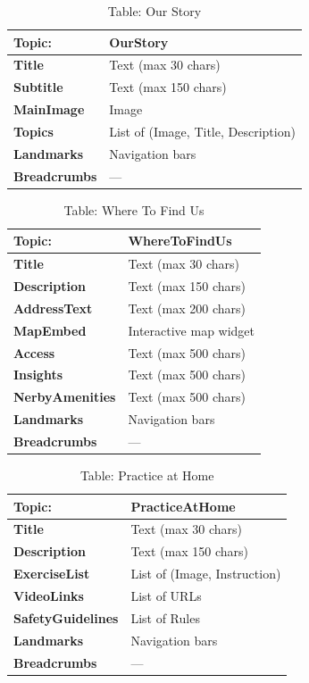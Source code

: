 \begin{table}[H]
\centering
\begin{tabularx}{\textwidth}{|>{\bfseries}l|X|}
\hline
Topic: & \textbf{OurStory} \\
\hline
Title & Text (max 30 chars) \\
\hline
Subtitle & Text (max 150 chars) \\
\hline
MainImage & Image \\
\hline
Topics & List of (Image, Title, Description) \\
\hline
Landmarks & Navigation bars \\
\hline
Breadcrumbs & — \\
\hline
\end{tabularx}
\caption{Table: Our Story}
\end{table}

\begin{table}[H]
\centering
\begin{tabularx}{\textwidth}{|>{\bfseries}l|X|}
\hline
Topic: & \textbf{WhereToFindUs} \\
\hline
Title & Text (max 30 chars) \\
\hline
Description & Text (max 150 chars) \\
\hline
AddressText & Text (max 200 chars) \\
\hline
MapEmbed & Interactive map widget \\
\hline
Access & Text (max 500 chars) \\
\hline
Insights & Text (max 500 chars) \\
\hline
NerbyAmenities & Text (max 500 chars) \\
\hline
Landmarks & Navigation bars \\
\hline
Breadcrumbs & — \\
\hline
\end{tabularx}
\caption{Table: Where To Find Us}
\end{table}

\begin{table}[H]
\centering
\begin{tabularx}{\textwidth}{|>{\bfseries}l|X|}
\hline
Topic: & \textbf{PracticeAtHome} \\
\hline
Title & Text (max 30 chars) \\
\hline
Description & Text (max 150 chars) \\
\hline
ExerciseList & List of (Image, Instruction) \\
\hline
VideoLinks & List of URLs \\
\hline
SafetyGuidelines & List of Rules \\
\hline
Landmarks & Navigation bars \\
\hline
Breadcrumbs & — \\
\hline
\end{tabularx}
\caption{Table: Practice at Home}
\end{table}

